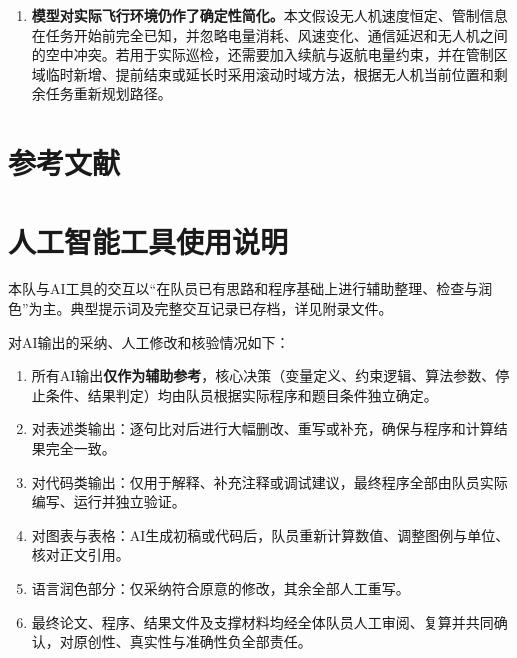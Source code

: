 \documentclass[UTF8,a4paper,12pt]{ctexart}
\numberwithin{equation}{section}
\numberwithin{equation}{section}
\begin{document}
\begin{enumerate}[label=（\arabic*）]
  \item \textbf{模型对实际飞行环境仍作了确定性简化。}本文假设无人机速度恒定、管制信息在任务开始前完全已知，并忽略电量消耗、风速变化、通信延迟和无人机之间的空中冲突。若用于实际巡检，还需要加入续航与返航电量约束，并在管制区域临时新增、提前结束或延长时采用滚动时域方法，根据无人机当前位置和剩余任务重新规划路径\cite{adamo2024}。
\end{enumerate}

\clearpage
\section*{参考文献}



\clearpage
\section*{人工智能工具使用说明}

本队与AI工具的交互以“在队员已有思路和程序基础上进行辅助整理、检查与润色”为主。典型提示词及完整交互记录已存档，详见附录文件。

\noindent 对AI输出的采纳、人工修改和核验情况如下：

\begin{enumerate}[label=\arabic*.]
  \item 所有AI输出\textbf{仅作为辅助参考}，核心决策（变量定义、约束逻辑、算法参数、停止条件、结果判定）均由队员根据实际程序和题目条件独立确定。
  \item 对表述类输出：逐句比对后进行大幅删改、重写或补充，确保与程序和计算结果完全一致。
  \item 对代码类输出：仅用于解释、补充注释或调试建议，最终程序全部由队员实际编写、运行并独立验证。
  \item 对图表与表格：AI生成初稿或代码后，队员重新计算数值、调整图例与单位、核对正文引用。
  \item 语言润色部分：仅采纳符合原意的修改，其余全部人工重写。
  \item 最终论文、程序、结果文件及支撑材料均经全体队员人工审阅、复算并共同确认，对原创性、真实性与准确性负全部责任。
\end{enumerate}
\end{document}
